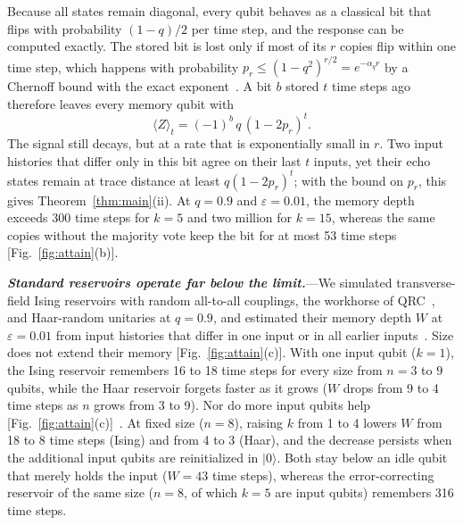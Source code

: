 \documentclass[aps,prl,twocolumn,superscriptaddress,floatfix]{revtex4-2}
\theoremstyle{plain}
\newcommand{\ket}[1]{|#1\rangle}
\newcommand{\runin}[1]{\textit{\textbf{#1}}---}
\begin{document}
Because all states remain diagonal, every qubit behaves as a classical bit that flips with probability $(1-q)/2$ per time step, and the response can be computed exactly. The stored bit is lost only if most of its $r$ copies flip within one time step, which happens with probability $p_r\le(1-q^2)^{r/2}=e^{-\alpha_qr}$ by a Chernoff bound with the exact exponent~\cite{SM}. A bit $b$ stored $t$ time steps ago therefore leaves every memory qubit with
\begin{equation}
\langle Z\rangle_t=(-1)^b\,q\,(1-2p_r)^t .
\label{eq:response}
\end{equation}
The signal still decays, but at a rate that is exponentially small in $r$. Two input histories that differ only in this bit agree on their last $t$ inputs, yet their echo states remain at trace distance at least $q(1-2p_r)^t$; with the bound on $p_r$, this gives Theorem~\ref{thm:main}(ii). At $q=0.9$ and $\varepsilon=0.01$, the memory depth exceeds 300 time steps for $k=5$ and two million for $k=15$, whereas the same copies without the majority vote keep the bit for at most 53 time steps [Fig.~\ref{fig:attain}(b)].

\runin{Standard reservoirs operate far below the limit.}We simulated transverse-field Ising reservoirs with random all-to-all couplings, the workhorse of QRC~\cite{Fujii2017,Nakajima2019,MartinezPena2021}, and Haar-random unitaries at $q=0.9$, and estimated their memory depth $W$ at $\varepsilon=0.01$ from input histories that differ in one input or in all earlier inputs~\cite{SM}. Size does not extend their memory [Fig.~\ref{fig:attain}(c)]. With one input qubit ($k=1$), the Ising reservoir remembers 16 to 18 time steps for every size from $n=3$ to $9$ qubits, while the Haar reservoir forgets faster as it grows ($W$ drops from 9 to 4 time steps as $n$ grows from 3 to 9). Nor do more input qubits help [Fig.~\ref{fig:attain}(c)]~\cite{SM}. At fixed size ($n=8$), raising $k$ from 1 to 4 lowers $W$ from 18 to 8 time steps (Ising) and from 4 to 3 (Haar), and the decrease persists when the additional input qubits are reinitialized in $\ket0$. Both stay below an idle qubit that merely holds the input ($W=43$ time steps), whereas the error-correcting reservoir of the same size ($n=8$, of which $k=5$ are input qubits) remembers 316 time steps.
\end{document}

